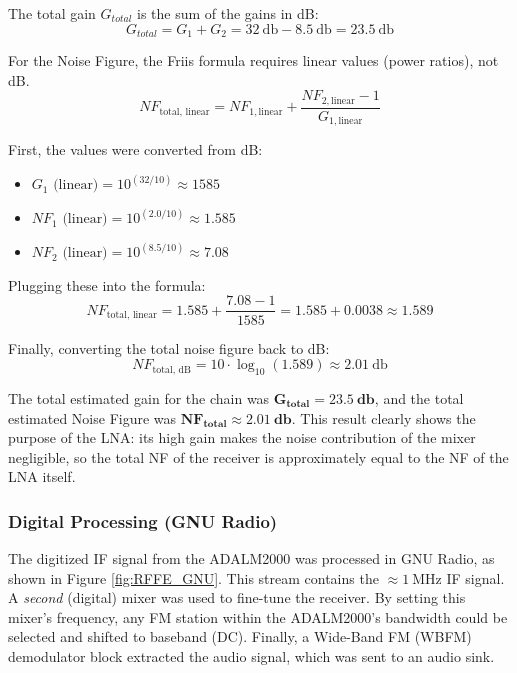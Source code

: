 The total gain $G_{total}$ is the sum of the gains in dB:
\begin{equation}
    G_{total} = G_1 + G_2 = \SI{32}{\decibel} - \SI{8.5}{\decibel} = \SI{23.5}{\decibel}
\end{equation}

For the Noise Figure, the Friis formula requires linear values (power ratios), not dB.
\begin{equation}
    NF_{\text{total, linear}} = NF_{1, \text{linear}} + \frac{NF_{2, \text{linear}} - 1}{G_{1, \text{linear}}}
\end{equation}

First, the values were converted from dB:
\begin{itemize}
    \item $G_1 \text{ (linear)} = 10^{(32 / 10)} \approx 1585$
    \item $NF_1 \text{ (linear)} = 10^{(2.0 / 10)} \approx 1.585$
    \item $NF_2 \text{ (linear)} = 10^{(8.5 / 10)} \approx 7.08$
\end{itemize}

Plugging these into the formula:
\begin{equation}
    NF_{\text{total, linear}} = 1.585 + \frac{7.08 - 1}{1585} = 1.585 + 0.0038 \approx 1.589
\end{equation}

Finally, converting the total noise figure back to dB:
\begin{equation}
    NF_{\text{total, dB}} = 10 \cdot \log_{10}(1.589) \approx \SI{2.01}{\decibel}
\end{equation}

The total estimated gain for the chain was $\mathbf{G_{total} = \SI{23.5}{\decibel}}$, and the total estimated Noise Figure was $\mathbf{NF_{total} \approx \SI{2.01}{\decibel}}$. This result clearly shows the purpose of the LNA: its high gain makes the noise contribution of the mixer negligible, so the total NF of the receiver is approximately equal to the NF of the LNA itself.

\subsubsection{Digital Processing (GNU Radio)}
The digitized IF signal from the ADALM2000 was processed in GNU Radio, as shown in Figure \ref{fig:RFFE_GNU}. This stream contains the $\approx \SI{1}{\mega\hertz}$ IF signal. A \textit{second} (digital) mixer was used to fine-tune the receiver. By setting this mixer's frequency, any FM station within the ADALM2000's bandwidth could be selected and shifted to baseband (DC). Finally, a Wide-Band FM (WBFM) demodulator block extracted the audio signal, which was sent to an audio sink.

